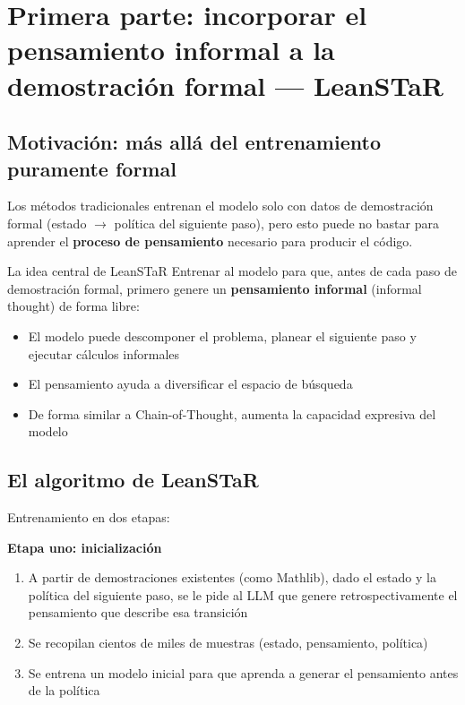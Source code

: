 \section{Primera parte: incorporar el pensamiento informal a la demostración formal — LeanSTaR}

\subsection{Motivación: más allá del entrenamiento puramente formal}

Los métodos tradicionales entrenan el modelo solo con datos de demostración formal (estado $\to$ política del siguiente paso), pero esto puede no bastar para aprender el \textbf{proceso de pensamiento} necesario para producir el código.

\begin{importantbox}{La idea central de LeanSTaR}
Entrenar al modelo para que, antes de cada paso de demostración formal, primero genere un \textbf{pensamiento informal} (informal thought) de forma libre:
\begin{itemize}
    \item El modelo puede descomponer el problema, planear el siguiente paso y ejecutar cálculos informales
    \item El pensamiento ayuda a diversificar el espacio de búsqueda
    \item De forma similar a Chain-of-Thought, aumenta la capacidad expresiva del modelo
\end{itemize}
\end{importantbox}

\subsection{El algoritmo de LeanSTaR}

Entrenamiento en dos etapas:

\textbf{Etapa uno: inicialización}
\begin{enumerate}
    \item A partir de demostraciones existentes (como Mathlib), dado el estado y la política del siguiente paso, se le pide al LLM que genere retrospectivamente el pensamiento que describe esa transición
    \item Se recopilan cientos de miles de muestras (estado, pensamiento, política)
    \item Se entrena un modelo inicial para que aprenda a generar el pensamiento antes de la política
\end{enumerate}

